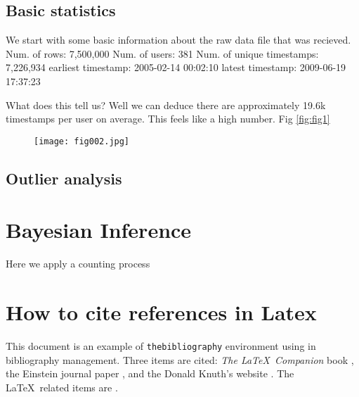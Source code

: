 \subsection{Basic statistics} 

We start with some basic information about the raw data file that was recieved. 
Num. of rows: 7,500,000
Num. of users: 381
Num. of unique timestamps: 7,226,934
earliest timestamp: 2005-02-14 00:02:10
latest timestamp: 2009-06-19 17:37:23

What does this tell us? Well we can deduce there are approximately 19.6k timestamps per user on average. This feels like a high number. Fig \ref{fig:fig1}

\begin{figure}[h!]
	\centering
	\texttt{[image: fig002.jpg]}
	\caption{}
	\label{fig:fig2}
\end{figure} 


\subsection{Outlier analysis} 


\section{Bayesian Inference}

Here we apply a counting process


\section{How to cite references in Latex}
\parencite{Reference1}

\medskip

This document is an example of \texttt{thebibliography} environment using 
in bibliography management. Three items are cited: \textit{The \LaTeX\ Companion} 
book \cite{latexcompanion}, the Einstein journal paper \cite{einstein}, and the 
Donald Knuth's website \cite{knuthwebsite}. The \LaTeX\ related items are
\cite{latexcompanion,knuthwebsite}. 

\medskip
